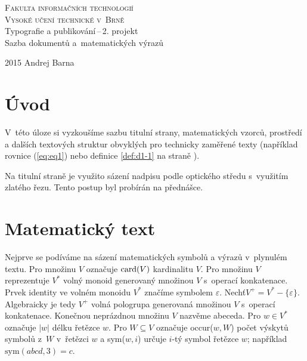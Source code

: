 \documentclass[11pt,a4paper,twocolumn]{article}
\begin{document}
\begin{titlepage}
\begin{center}
\Huge
\textsc{Fakulta informačních technologií\\Vysoké učení technické v~Brně}
\LARGE \\Typografie a publikování\,--\,2. projekt\\
Sazba dokumentů a~matematických výrazů\\
\end{center}
\Large 2015 \hfill Andrej Barna
\end{titlepage}
\theoremstyle{definition}
\newtheorem{dfn}{Definice}[section]
\theoremstyle{plain}
\newtheorem{alg}[dfn]{Algoritmus}
\newtheorem{vet}{Věta}
\section*{Úvod}
V~této úloze si vyzkoušíme sazbu titulní strany, matematických vzorců, prostředí a dalších textových struktur obvyklých pro technicky zaměřené texty (například rovnice (\ref{eq:eq1}) nebo definice \ref{def:d1-1} na straně \pageref{def:d1-1}).

Na titulní straně je využito sázení nadpisu podle optického středu s~využitím zlatého řezu. Tento postup byl probírán na přednášce.


\section{Matematický text}
Nejprve se podíváme na sázení matematických symbolů a výrazů v~plynulém textu. Pro množinu $V$ označuje $\mathrm{card(\mathnormal{V})}$ kardinalitu $V$.
Pro množinu $V$ reprezentuje $V^*$ volný monoid generovaný množinou $V$ s~operací konkatenace.
Prvek identity ve volném monoidu $V^*$ značíme symbolem $\varepsilon$.
Nechť$V^+=V^*-\{\varepsilon\}$. Algebraicky je tedy $V^+$ volná pologrupa generovaná množinou $V$ s~operací konkatenace.
Konečnou neprázdnou množinu $V$ nazvěme abeceda.
Pro $w\in V^*$ označuje $|w|$ délku řetězce $w$. Pro $W\subseteq V$ označuje occur($w, W$) počet výskytů symbolů z~$W$ v~řetězci $w$ a sym($w,i$) určuje $i$-tý symbol řetězce $w$; například $\text{sym}(abcd,3)=c$.
\end{document}
